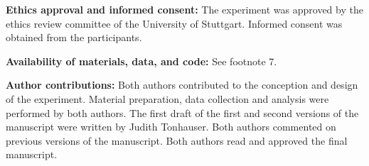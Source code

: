 \documentclass[11pt,fleqn]{article}
\newcommand{\6}{\mbox{$[\hspace*{-.6mm}[$}}
\newcommand{\9}{\mbox{$]\hspace*{-.6mm}]$}}
\begin{document}
\bigskip

\noindent
{\bf Ethics approval and informed consent:} The experiment was approved by the ethics review committee of the University of Stuttgart. Informed consent was obtained from the participants.

\bigskip

\noindent
{\bf Availability of materials, data, and code:} See footnote 7.

\bigskip

\noindent
{\bf Author contributions:} Both authors contributed to the conception and design of the experiment. Material preparation, data collection and analysis were performed by both authors. The first draft of the first and second versions of the manuscript were written by Judith Tonhauser. Both authors commented on previous versions of the manuscript. Both authors read and approved the final manuscript.

\newpage

\clearpage
{}	



%



 
\end{document}
